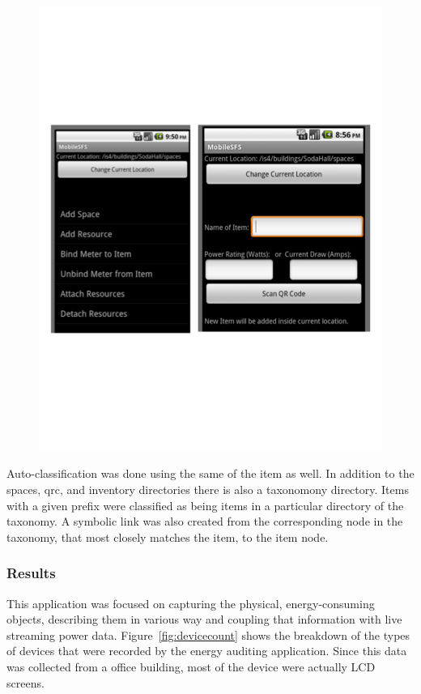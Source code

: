 \begin{figure}[htb!]
\begin{center}
\includegraphics[scale=0.39]{figs/msfsv2screens}
\caption{}
\label{fig:msfsv2}
\end{center}
\end{figure}

Auto-classification was done using the same of the item as well.  In addition to the spaces, qrc, and inventory directories
there is also a taxonomony directory.  Items with a given prefix were classified as being items in a particular
directory of the taxonomy.  A symbolic link was also created from the corresponding node in the taxonomy, that most closely
matches the item, to the item node.

\subsubsection{Results}
This application was focused on capturing the physical, energy-consuming objects, describing them in various way
and coupling that information with live streaming power data.  Figure~\ref{fig:devicecount} shows the breakdown of the
types of devices that were recorded by the energy auditing application.  Since this data was collected from a office
building, most of the device were actually LCD screens.

